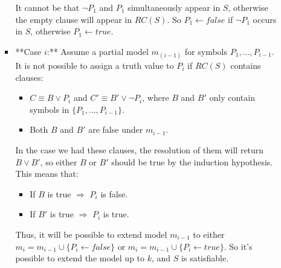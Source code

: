 \documentclass[12pt]{article}
\begin{document}
\begin{enumerate}[label=\textbf{PL.\arabic*}]
\begin{enumerate}
\begin{itemize}
                              It cannot be that $\lnot P_1$ and $P_1$ simultaneously appear in $S$, otherwise the empty clause will appear in $RC(S)$. So $P_1 \leftarrow false$ if $\lnot P_1$ occurs in $S$, otherwise $P_1 \leftarrow true$.
                        \item **Case $i$:** Assume a partial model $m_{(i-1)}$ for symbols $P_1, \ldots, P_{i-1}$. It is not possible to assign a truth value to $P_i$ if $RC(S)$ contains clauses:
                              \begin{itemize}
                                  \item $C\equiv B\lor P_i$ and $C'\equiv B'\lor\lnot P_i$, where $B$ and $B'$ only contain symbols in $\{P_1, \ldots, P_{i-1}\}$.
                                  \item Both $B$ and $B'$ are false under $m_{i-1}$.
                              \end{itemize}
                              In the case we had these clauses, the resolution of them will return $B\lor B'$, so either $B$ or $B'$ should be true by the induction hypothesis. This means that:
                              \begin{itemize}
                                  \item If $B$ is true $\Rightarrow$ $P_i$ is false.
                                  \item If $B'$ is true $\Rightarrow$ $P_i$ is true.
                              \end{itemize}
                              Thus, it will be possible to extend model $m_{i-1}$ to either $m_i = m_{i-1}\cup\{P_i \leftarrow false\}$ or $m_i = m_{i-1}\cup\{P_i \leftarrow true\}$. So it's possible to extend the model up to $k$, and $S$ is satisfiable.
                    \end{itemize}
          \end{enumerate}

\end{enumerate}
\end{document}

